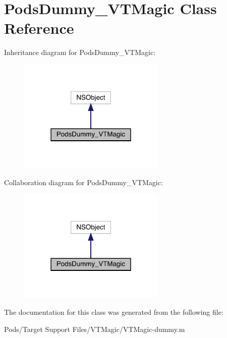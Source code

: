 \hypertarget{interface_pods_dummy___v_t_magic}{}\section{Pods\+Dummy\+\_\+\+V\+T\+Magic Class Reference}
\label{interface_pods_dummy___v_t_magic}


Inheritance diagram for Pods\+Dummy\+\_\+\+V\+T\+Magic\+:\nopagebreak
\begin{figure}[H]
\begin{center}
\leavevmode
\includegraphics[width=198pt]{interface_pods_dummy___v_t_magic__inherit__graph}
\end{center}
\end{figure}


Collaboration diagram for Pods\+Dummy\+\_\+\+V\+T\+Magic\+:\nopagebreak
\begin{figure}[H]
\begin{center}
\leavevmode
\includegraphics[width=198pt]{interface_pods_dummy___v_t_magic__coll__graph}
\end{center}
\end{figure}


The documentation for this class was generated from the following file\+:\begin{DoxyCompactItemize}
\item 
Pods/\+Target Support Files/\+V\+T\+Magic/V\+T\+Magic-\/dummy.\+m\end{DoxyCompactItemize}
